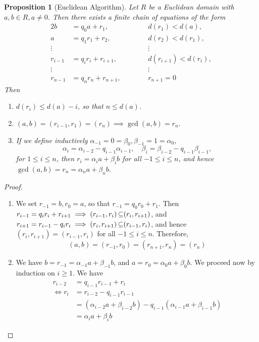 \documentclass[11pt]{book}
\newcounter{counter}
\newtheorem{proposition}[counter]{Proposition}   \newtheorem{problem}[counter]{Problem}   \newtheorem*{proposition*}{Proposition}   \newtheorem*{lemma*}{Lemma}
\theoremstyle{definition}   \newtheorem{defn}[counter]{Definition} %
\newcommand{\vs}{\vspace{8pt}}
\numberwithin{counter}{chapter}
\begin{document}
\vs

\begin{proposition}[Euclidean Algorithm]
Let $R$ be a Euclidean domain with $a,b \in R, a \ne 0$. Then there exists a finite chain of equations of the form
\begin{alignat*}{2}
b &= q_0a + r_1, \qquad \qquad && d(r_1) < d(a), \\
a &= q_1 r_1 + r_2,     && d(r_2) < d(r_1), \\
\vdots & &&\vdots \\
r_{i-1} &= q_i r_i + r_{i+1},   && d(r_{i+1})<d(r_i), \\
\vdots & && \vdots \\
r_{n-1} &= q_n r_n + r_{n+1}, && r_{n+1} = 0
\end{alignat*}
Then
\begin{enumerate}
\item[(a)] $d(r_i) \leq d(a)-i$, so that $n \leq d(a)$.
\item[(b)] $(a,b) = (r_{i-1},r_1) = (r_n) \implies \gcd(a,b) = r_n$.
\item[(c)] If we define inductively $\alpha_{-1} = 0 = \beta_0, \beta_{-1} = 1 = \alpha_0$,
	\[\alpha_i = \alpha_{i-2} - q_{i-1}\alpha_{i-1}, \quad \beta_i = \beta_{i-2} - q_{i-1}\beta_{i-1}, \]
for $1 \leq i \leq n$, then $r_i = \alpha_ia + \beta_i b$ for all $-1 \leq i \leq n$, and hence $\gcd(a,b) = r_n = \alpha_n a + \beta_n b$.
\end{enumerate}
\end{proposition}

\begin{proof}
\
\begin{enumerate}
\item[(b)] We set $r_{-1} = b, r_0 = a$, so that $r_{-1} = q_0 r_0 + r_1$. Then $r_{i-1} = q_i r_i + r_{i+1} \implies (r_{i-1},r_i) \operatorname{\subseteq} (r_i,r_{i+1})$, and $r_{i+1} = r_{i-1} - q_i r_i \implies (r_i,r_{i+1}) \operatorname{\subseteq} (r_{i-1},r_i)$, and hence $(r_i,r_{i+1}) = (r_{i-1},r_i)$ for all $-1 \leq i \leq n$. Therefore,
	\[(a,b) = (r_{-1},r_0) = (r_{n+1},r_n) = (r_n) \]
\item[(c)] We have $b = r_{-1} = \alpha_{-1}a + \beta_{-1}b$, and $a = r_0 =\alpha_0 a + \beta_0 b$. We proceed now by induction on $i \geq 1$. We have
\begin{align*}
r_{i-2} &= q_{i-1}r_{i-1} + r_i \\
\iff r_i &= r_{i-2} - q_{i-1}r_{i-1} \\
&= (\alpha_{i-2} a + \beta_{i-2}b) - q_{i-1}(\alpha_{i-1}a + \beta_{i-1}b) \tag{by induction hypothesis} \\
&= \alpha_i a + \beta_i b
\end{align*}
\end{enumerate}
\end{proof}
\end{document}
